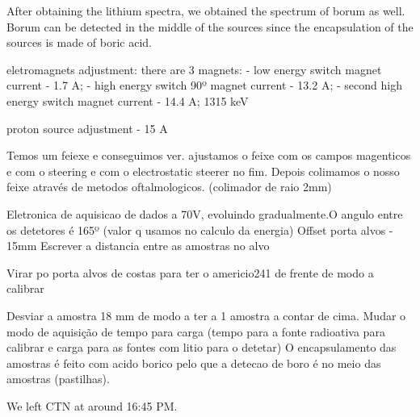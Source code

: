 \documentclass{article}
\begin{document}
After obtaining the lithium spectra, we obtained the spectrum of borum as well. Borum can be detected in the middle of the sources since the encapsulation of the sources is made of boric acid. 



eletromagnets adjustment: there are 3 magnets:
- low energy switch magnet current - 1.7 A;
- high energy switch 90º magnet current - 13.2 A;
- second high energy switch magnet current - 14.4 A;
1315 keV

proton source adjustment - 15 A 

Temos um feiexe e conseguimos ver. ajustamos o feixe com os campos magenticos e com o steering e com o electrostatic steerer no fim. Depois colimamos o nosso feixe através de metodos oftalmologicos. (colimador de raio 2mm)

Eletronica de aquisicao de dados a 70V, evoluindo gradualmente.O angulo entre os detetores é 165º (valor q usamos no calculo da energia)
Offset porta alvos - 15mm
Escrever a distancia entre as amostras no alvo

Virar po porta alvos de costas para ter o americio241 de frente de modo a calibrar

Desviar a amostra 18 mm de modo a ter a 1 amostra a contar de cima. Mudar o modo de aquisição de tempo para carga (tempo para a fonte radioativa para calibrar e carga para as fontes com litio para o detetar)
O encapsulamento das amostras é feito com acido borico pelo que a detecao de boro é no meio das amostras (pastilhas).

We left CTN at around 16:45 PM.

\printbibliography
\nocite{*}
\end{document}
